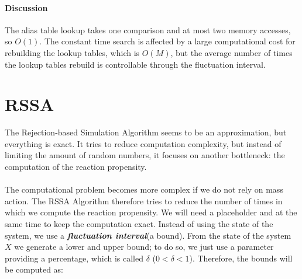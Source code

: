       \paragraph{Discussion}
      The alias table lookup takes one comparison and at most two memory accesses, so $O(1)$.
      The constant time search is affected by a large computational cost for rebuilding the lookup tables, which is $O(M)$, but the average number of times the lookup tables rebuild is controllable through the fluctuation interval.












































\section{RSSA}
The Rejection-based Simulation Algorithm seems to be an approximation, but everything is exact.
It tries to reduce computation complexity, but instead of limiting the amount of random numbers, it focuses on another bottleneck: the computation of the reaction propensity.
\\
\\
\noindent
The computational problem becomes more complex if we do not rely on mass action.
The RSSA Algorithm therefore tries to reduce the number of times in which we compute the reaction propensity.
We will need a placeholder and at the same time to keep the computation exact.
Instead of using the state of the system, we use a \textbf{\emph{fluctuation interval}}(a bound).
From the state of the system $X$ we generate a lower and upper bound; to do so, we just use a parameter providing a percentage, which is called $\delta$ ($0<\delta<1$).
Therefore, the bounds will be computed as:

